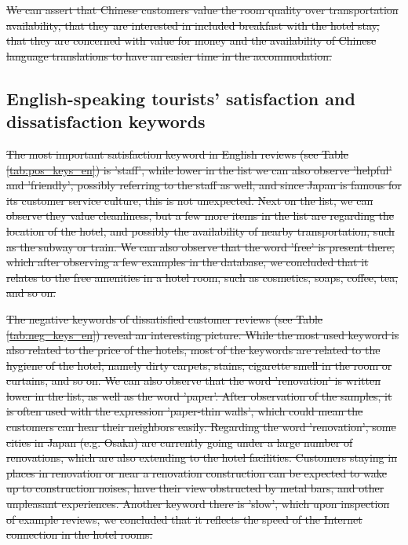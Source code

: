 \documentclass[review]{elsarticle}
\providecommand{\DIFdel}[1]{{\protect\color{red}\sout{#1}}}                      %
\begin{document}
\DIFdel{We can assert that Chinese customers value the room quality over transportation availability, that they are interested in included breakfast with the hotel stay, that they are concerned with value for money and the availability of Chinese language translations to have an easier time in the accommodation.
}%


\subsection{English-speaking tourists' satisfaction and dissatisfaction keywords}

\DIFdel{The most important satisfaction keyword in English reviews (see Table \ref{tab:pos_keys_en}) is 'staff', while lower in the list we can also observe 'helpful' and 'friendly', possibly referring to the staff as well, and since Japan is famous for its customer service culture, this is not unexpected. Next on the list, we can observe they value cleanliness, but a few more items in the list are regarding the location of the hotel, and possibly the availability of nearby transportation, such as the subway or train. We can also observe that the word 'free' is present there, which after observing a few examples in the database, we concluded that it relates to the free amenities in a hotel room, such as cosmetics, soaps, coffee, tea, and so on.
}%

\DIFdel{The negative keywords of dissatisfied customer reviews (see Table \ref{tab:neg_keys_en}) reveal an interesting picture. While the most used keyword is also related to the price of the hotels, most of the keywords are related to the hygiene of the hotel, namely dirty carpets, stains, cigarette smell in the room or curtains, and so on. We can also observe that the word 'renovation' is written lower in the list, as well as the word 'paper'. After observation of the samples, it is often used with the expression 'paper-thin walls', which could mean the customers can hear their neighbors easily. Regarding the word 'renovation', some cities in Japan (e.g. Osaka) are currently going under a large number of renovations, which are also extending to the hotel facilities. Customers staying in places in renovation or near a renovation construction can be expected to wake up to construction noises, have their view obstructed by metal bars, and other unpleasant experiences. Another keyword there is 'slow', which upon inspection of example reviews, we concluded that it reflects the speed of the Internet connection in the hotel rooms.
}%
\end{document}

